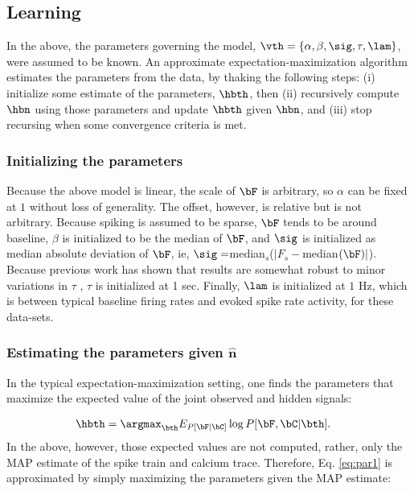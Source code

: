 \subsection{Learning} \label{sec:learn}

In the above, the parameters governing the model, $\vth=\{\alpha, \beta, \sig, \tau, \lam\}$, were assumed to be known. An approximate expectation-maximization algorithm estimates the parameters from the data, by thaking the following steps: (i) initialize some estimate of the parameters, $\hbth$, then (ii) recursively compute $\hbn$ using those parameters and update $\hbth$ given $\hbn$, and (iii) stop recursing when some convergence criteria is met.  

\subsubsection{Initializing the parameters}

Because the above model is linear, the scale of $\bF$ is arbitrary, so $\alpha$ can be fixed at $1$ without loss of generality.  The offset, however, is relative but is not arbitrary.  Because spiking is assumed to be sparse, $\bF$ tends to be around baseline, $\beta$ is initialized to be the median of $\bF$, and $\sig$ is initialized as median absolute deviation of $\bF$, ie, $\sig=$median$_s$($|F_s-$median$(\bF)|$).  Because previous work has shown that results are somewhat robust to minor variations in $\tau$ \cite{YaksiFriedrich06}, $\tau$ is initialized at 1 sec.  Finally, $\lam$ is initialized at $1$ Hz, which is between typical baseline firing rates and evoked spike rate activity, for these data-sets.

\subsubsection{Estimating the parameters given $\widehat{\mathbf{n}}$}

In the typical expectation-maximization setting, one finds the parameters that maximize the expected value of the joint observed and hidden signals:

\begin{align} \label{eq:par1}
\hbth &= \argmax_{\bth} E_{P[\bF | \bC]} \log P[\bF, \bC | \bth].
\end{align}
In the above, however, those expected values are not computed, rather, only the MAP estimate of the spike train and calcium trace.  Therefore, Eq. \eqref{eq:par1} is approximated by simply maximizing the parameters given the MAP estimate:

